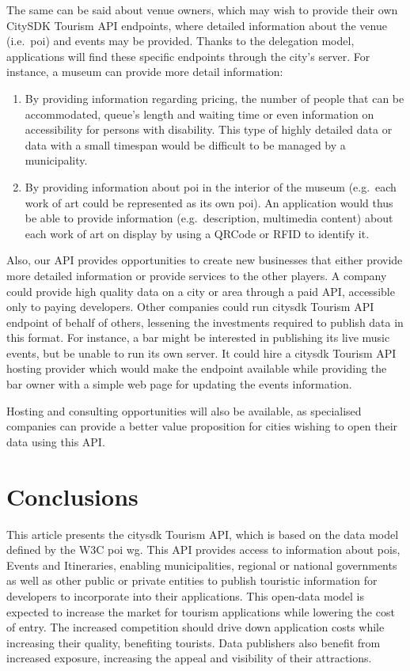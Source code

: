 \documentclass[times,doublespace]{ettauth}%
\begin{document}
The same can be said about venue owners, which may wish to provide their own CitySDK Tourism API endpoints, where detailed information about the venue (i.e.\ \ac{poi}) and events may be provided.
Thanks to the delegation model, applications will find these specific endpoints through the city's server.
For instance, a museum can provide more detail information: 
\begin{enumerate}
\item By providing information regarding pricing, the number of people that can be accommodated, queue's length and waiting time or even information on accessibility for persons with disability. This type of highly detailed data or data with a small timespan would be difficult to be managed by a municipality.
\item By providing information about \ac{poi} in the interior of the museum (e.g.\  each work of art could be represented as its own \ac{poi}). An application would thus be able to provide information (e.g.\ description, multimedia content) about each work of art on display by using a QRCode or RFID to identify it.
\end{enumerate} 

Also, our API provides opportunities to create new businesses that either provide more detailed information or provide services to the other players.
A company could provide high quality data on a city or area through a paid API, accessible only to paying developers.
Other companies could run \ac{citysdk} Tourism API endpoint of behalf of others, lessening the investments required to publish data in this format.
For instance, a bar might be interested in publishing its live music events, but be unable to run its own server.
It could hire a \ac{citysdk} Tourism API hosting provider which would make the endpoint available while providing the bar owner with a simple web page for updating the events information.

Hosting and consulting opportunities will also be available, as specialised companies can provide a better value proposition for cities wishing to open their data using this API\@.


\section{Conclusions}
\label{s:conclusions}
This article presents the \ac{citysdk} Tourism API, which is based on the data model defined by the \ac{W3C} \ac{poi} \ac{wg}.
This API provides access to information about \acp{poi}, Events and Itineraries, enabling municipalities, regional or national governments as well as other public or private entities to publish touristic information for developers to incorporate into their applications.
This open-data model is expected to increase the market for tourism applications while lowering the cost of entry.
The increased competition should drive down application costs while increasing their quality, benefiting tourists.
Data publishers also benefit from increased exposure, increasing the appeal and visibility of their attractions.
\end{document}
